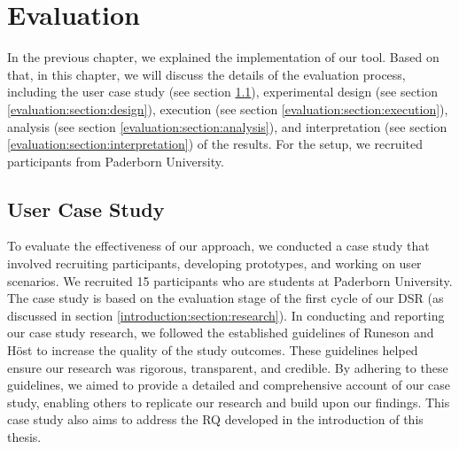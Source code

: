 
\chapter{Evaluation}
\label{chap:evaluation}
In the previous chapter, we explained the implementation of our tool. 
Based on that, in this chapter, we will discuss the details of the evaluation process, including the user case study (see section \ref{evaluation:section:casestudy}), experimental design (see section \ref{evaluation:section:design}), execution (see section \ref{evaluation:section:execution}), analysis (see section \ref{evaluation:section:analysis}), and interpretation (see section \ref{evaluation:section:interpretation}) of the results. 
For the setup, we recruited participants from Paderborn University.
\ifpdf
    \graphicspath{{Chapters/Evaluation/Figs/}{Chapters/Evaluation/Figs/}{Chapters/Evaluation/Figs/}}
\else
    \graphicspath{{Chapters/Evaluation/Figs/}{Chapters/Evaluation/Figs/}}
\fi

\section{User Case Study}
\label{evaluation:section:casestudy}
To evaluate the effectiveness of our approach, we conducted a case study that involved recruiting participants, developing prototypes, and working on user scenarios. 
We recruited 15 participants who are students at Paderborn University. 
The case study is based on the evaluation stage of the first cycle of our DSR (as discussed in section \ref{introduction:section:research}). 
In conducting and reporting our case study research, we followed the established guidelines of Runeson and Höst \cite{eval:guidlines:runeson} to increase the quality of the study outcomes. 
These guidelines helped ensure our research was rigorous, transparent, and credible. 
By adhering to these guidelines, we aimed to provide a detailed and comprehensive account of our case study, enabling others to replicate our research and build upon our findings.
This case study also aims to address the RQ developed in the introduction of this thesis.

